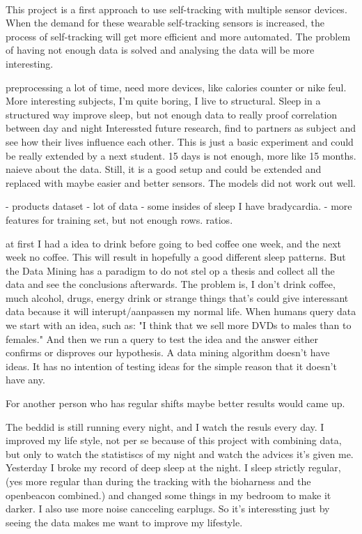 	\\
	 This project is a first approach to use self-tracking with multiple sensor devices. When the demand for these wearable self-tracking sensors is increased, the process of self-tracking will get more efficient and more automated. The problem of having not enough data is solved and analysing the data will be more interesting. 

	\iffalse
	preprocessing a lot of time, 
	need more devices, like calories counter or nike feul.
	More interesting subjects, I'm quite boring, I live to structural.
	Sleep in a structured way improve sleep, 
		but not enough data to really proof correlation between day and night
	Interessted future research, find to partners as subject and see how their lives influence each other.
	This is just a basic experiment and could be really extended by a next student.
	15 days is not enough, more like 15 months. 
	naieve about the data. 
	Still, it is a good setup and could be extended and replaced with maybe easier and better sensors. 
 The models did not work out well.


	- products dataset
	- lot of data
	-  some insides of sleep
	I have bradycardia. 
	- more features for training set, but not enough rows. ratios.

	at first I had a idea to drink before going to bed coffee one week, and the next week no coffee. This will result in hopefully a good different sleep patterns. But the Data Mining has a paradigm to do not stel op a thesis and collect all the data and see the conclusions afterwards. The problem is, I don't drink coffee, much alcohol, drugs, energy drink or strange things that's could give interessant data because it will interupt/aanpassen my normal life. 
When humans query data we start with an idea, such as: "I think that we sell more DVDs to males than to females." And then we run a query to test the idea and the answer either confirms or disproves our hypothesis. A data mining algorithm doesn't have ideas. It has no intention of testing ideas for the simple reason that it doesn't have any.

	For another person who has regular shifts maybe better results would came up.


	The beddid is still running every night, and I watch the resuls every day. I improved my life style, not per se because of this project with combining data, but only to watch the statistiscs of my night and watch the advices it's given me. Yesterday I broke my record of deep sleep at the night. I sleep strictly regular, (yes more regular than during the tracking with the bioharness and the openbeacon combined.) and changed some things in my bedroom to make it darker. I also use more noise cancceling earplugs. So it's interessting just by seeing the data makes me want to improve my lifestyle. 

